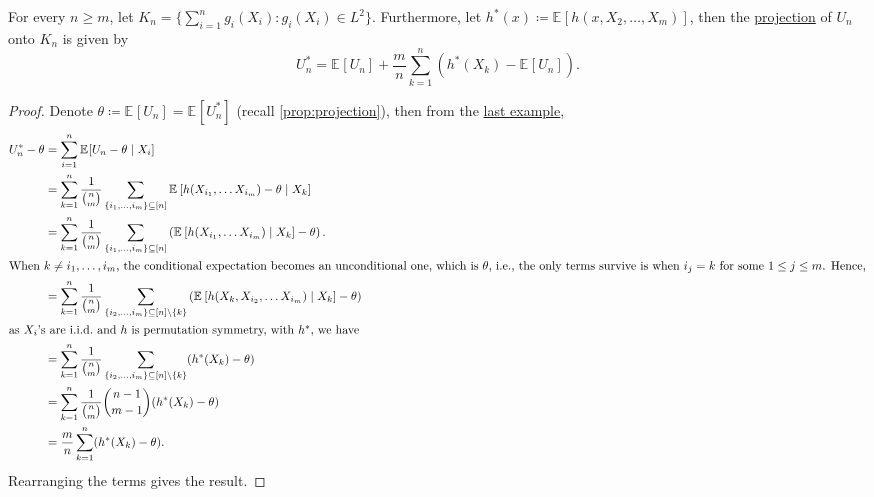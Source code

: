 \begin{proposition}\label{prop:U-statistic-projection}
	For every \(n \geq m\), let \(K_n = \{ \sum_{i=1}^{n} g_i(X_i) \colon g_i(X_i) \in L^2\} \). Furthermore, let \(h^{\ast} (x) \coloneqq \mathbb{E}_{}[h(x, X_2, \dots , X_m)] \), then the \hyperref[def:projection]{projection} of \(U_n\) onto \(K_n\) is given by
	\[
		U_n^{\ast}
		= \mathbb{E}_{}[U_n] + \frac{m}{n} \sum_{k=1}^{n} (h^{\ast} (X_k) - \mathbb{E}_{}[U_n] ).
	\]
\end{proposition}
\begin{proof}
	Denote \(\theta \coloneqq \mathbb{E}_{}[U_n] = \mathbb{E}_{}[U_n^{\ast} ] \) (recall \autoref{prop:projection}), then from the \hyperref[eg:projection]{last example},
	\begin{align*}
		U_n^{\ast} - \theta
		 & = \sum_{i=1}^{n} \mathbb{E}_{}[U_n - \theta \mid X_i]                                                                                                                                             \\
		 & = \sum_{k=1}^{n} \frac{1}{\binom{n}{m}} \sum_{\{ i_1, \dots , i_m \} \subseteq [n] } \mathbb{E}_{}\left[h(X_{i_1}, \dots X_{i_m}) - \theta \mid X_k\right]                                        \\
		 & = \sum_{k=1}^{n} \frac{1}{\binom{n}{m}} \sum_{\{ i_1, \dots , i_m \} \subseteq [n] } \left( \mathbb{E}_{}\left[h(X_{i_1}, \dots X_{i_m}) \mid X_k\right] - \theta \right).                        \\
		\shortintertext{When \(k \neq i_1, \dots , i_m\), the conditional expectation becomes an unconditional one, which is \(\theta \), i.e., the only terms survive is when \(i_j = k\) for some \(1 \leq j \leq m\). Hence,}
		 & = \sum_{k=1}^{n} \frac{1}{\binom{n}{m}} \sum_{\{ i_2, \dots , i_m \} \subseteq [n] \setminus \{ k \} } \left( \mathbb{E}_{}\left[h(X_k, X_{i_2}, \dots X_{i_m}) \mid X_k \right] - \theta \right) \\
		\shortintertext{as \(X_i\)'s are i.i.d.\ and \(h\) is permutation symmetry, with \(h^{\ast} \), we have}
		 & = \sum_{k=1}^{n} \frac{1}{\binom{n}{m}} \sum_{\{ i_2, \dots , i_m \} \subseteq [n] \setminus \{ k \} } ( h^{\ast} (X_k) - \theta )                                                                \\
		 & =  \sum_{k=1}^{n} \frac{1}{\binom{n}{m}} \binom{n-1}{m-1} ( h^{\ast} (X_k) - \theta )                                                                                                             \\
		 & = \frac{m}{n} \sum_{k=1}^{n} (h^{\ast} (X_k) - \theta ).
	\end{align*}
	Rearranging the terms gives the result.
\end{proof}

